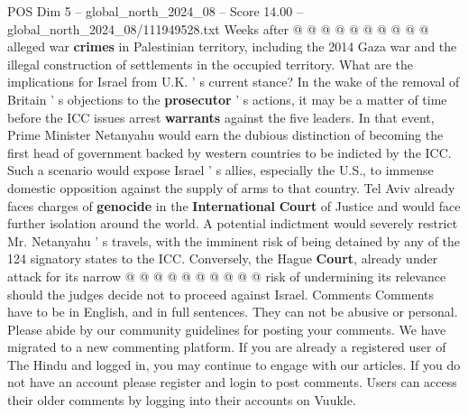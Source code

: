 \begin{textsample}{POS Dim 5 – global\_north\_2024\_08 – Score 14.00 – global\_north\_2024\_08/111949528.txt}
Weeks after @ @ @ @ @ @ @ @ @ @ alleged war \textbf{crimes} in Palestinian territory, including the 2014 Gaza war and the illegal construction of settlements in the occupied territory.
What are the implications for Israel from U.K. ' s current stance?
In the wake of the removal of Britain ' s objections to the \textbf{prosecutor} ' s actions, it may be a matter of time before the ICC issues arrest \textbf{warrants} against the five leaders.
In that event, Prime Minister Netanyahu would earn the dubious distinction of becoming the first head of government backed by western countries to be indicted by the ICC.
Such a scenario would expose Israel ' s allies, especially the U.S., to immense domestic opposition against the supply of arms to that country.
Tel Aviv already faces charges of \textbf{genocide} in the \textbf{International} \textbf{Court} of Justice and would face further isolation around the world.
A potential indictment would severely restrict Mr.
Netanyahu ' s travels, with the imminent risk of being detained by any of the 124 signatory states to the ICC.
Conversely, the Hague \textbf{Court}, already under attack for its narrow @ @ @ @ @ @ @ @ @ @ risk of undermining its relevance should the judges decide not to proceed against Israel.
Comments Comments have to be in English, and in full sentences.
They can not be abusive or personal.
Please abide by our community guidelines for posting your comments.
We have migrated to a new commenting platform.
If you are already a registered user of The Hindu and logged in, you may continue to engage with our articles.
If you do not have an account please register and login to post comments.
Users can access their older comments by logging into their accounts on Vuukle.

\end{textsample}
